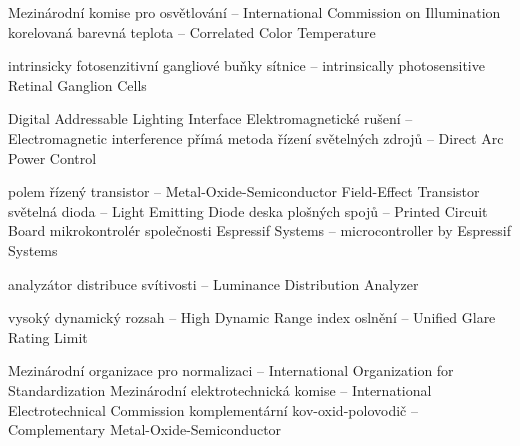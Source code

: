 


   {Mezinárodní komise pro osvětlování -- International Commission on Illumination}
   {korelovaná barevná teplota -- Correlated Color Temperature}

 {intrinsicky fotosenzitivní gangliové buňky sítnice -- intrinsically photosensitive Retinal Ganglion Cells}


  {Digital Addressable Lighting Interface}
  {Elektromagnetické rušení -- Electromagnetic interference}
 {přímá metoda řízení světelných zdrojů -- Direct Arc Power Control}

 {polem řízený transistor -- Metal-Oxide-Semiconductor Field-Effect Transistor}
    {světelná dioda -- Light Emitting Diode}
    {deska plošných spojů -- Printed Circuit Board}
  {mikrokontrolér společnosti Espressif Systems -- microcontroller by Espressif Systems}

    {analyzátor distribuce svítivosti -- Luminance Distribution Analyzer}

    {vysoký dynamický rozsah -- High Dynamic Range}
   {index oslnění -- Unified Glare Rating Limit}

    {Mezinárodní organizace pro normalizaci -- International Organization for Standardization}
    {Mezinárodní elektrotechnická komise -- International Electrotechnical Commission}
   {komplementární kov-oxid-polovodič -- Complementary Metal-Oxide-Semiconductor}

